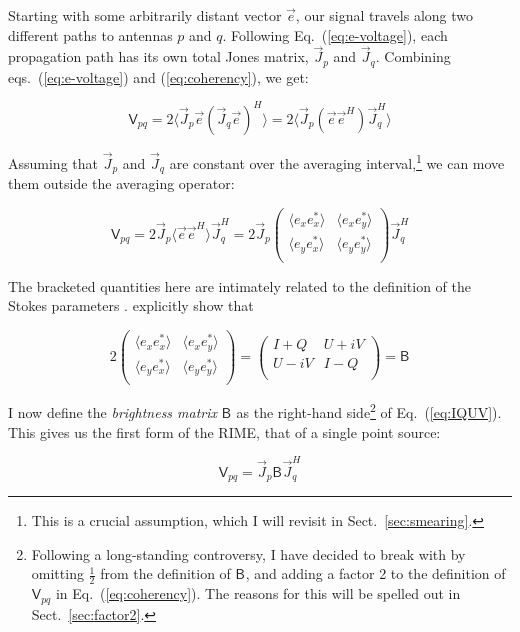 \documentclass{aa}
\newcommand{\matrixtt}[4]{\left( \begin{array}{cc}#1&#2\\#3&#4\\\end{array} \right)}
\newcommand{\herm}{H}
\newcommand{\jones}[2]{\vec {#1}_{#2}}
\newcommand{\jonesT}[2]{\vec {#1}^{\herm}_{#2}}
\newcommand{\coh}[2]{\mathsf{{#1}}_{{#2}}}
\begin{document}
Starting with some arbitrarily distant vector $\vec e$, our signal travels along two different paths to antennas $p$ and $q$. Following Eq.~(\ref{eq:e-voltage}), each propagation path has its own total Jones matrix, $\jones{J}{p}$ and $\jones{J}{q}$. Combining eqs.~(\ref{eq:e-voltage}) and (\ref{eq:coherency}), we get:

    \begin{equation}\label{eq:corr1}
    \coh{V}{pq} = 2 \langle  \jones{J}{p} \vec e ( \jones{J}{q} \vec e )^\herm \rangle  = 2 \langle  \jones{J}{p} (\vec e \vec e^\herm) \jonesT{J}{q} \rangle 
    \end{equation}

Assuming that $\jones{J}{p}$ and $\jones{J}{q}$ are constant over the averaging interval,\footnote{This is a crucial assumption, which I will revisit in Sect.~\ref{sec:smearing}.} we can move them outside the averaging operator:

    \begin{equation}\label{eq:corr2}
    \coh{V}{pq} = 2 \jones{J}{p} \langle  \vec e \vec e^\herm \rangle  \jonesT{J}{q} = 
    2 \jones{J}{p} 
    \matrixtt{\langle e_x e^*_x\rangle }{\langle e_x e^*_y\rangle }{\langle e_y e^*_x\rangle }{\langle e_y e^*_y\rangle }
    \jonesT{J}{q}
    \end{equation}

The bracketed quantities here are intimately related to the definition of the Stokes parameters \citep{born-wolf,tms}. \citet{ME3} explicitly show that

    \begin{equation}\label{eq:IQUV}
    2 
    \matrixtt{\langle e_x e^*_x\rangle }{\langle e_x e^*_y\rangle }{\langle e_y e^*_x\rangle }{\langle e_y e^*_y\rangle }
    = 
    \matrixtt{I+Q}{U+iV}{U-iV}{I-Q} = \coh{B}{}
    \end{equation}

I now define the {\em brightness matrix} $\coh{B}{}$ as the right-hand side\footnote{Following a long-standing controversy, I have decided to break with \citet{ME4} by omitting $\frac{1}{2}$ from the definition of $\coh{B}{}$, and adding a factor 2 to the definition of $\coh{V}{pq}$ in Eq.~(\ref{eq:coherency}). The reasons for this will be spelled out in Sect.~\ref{sec:factor2}.} of Eq.~(\ref{eq:IQUV}). This gives us the first form of the RIME, that of a single point source:

    \begin{equation}\label{eq:me0}
    \coh{V}{pq} = \jones{J}{p} \coh{B}{}  \jonesT{J}{q}
    \end{equation}
\end{document}
